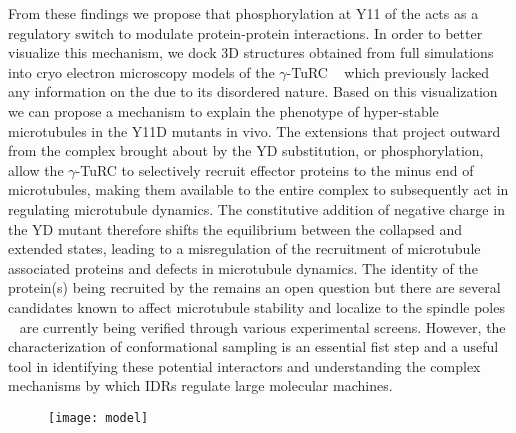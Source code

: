 \begin{figure}
\centering     %
{}
\label{fig:wells}
\end{figure}

From these findings we propose that phosphorylation at Y11 of the \gct acts as a regulatory switch to modulate protein-protein interactions. In order to better visualize this mechanism, we dock 3D structures obtained from full \tub simulations into cryo electron microscopy models of the $\gamma$-TuRC ~\cite{kollman2015ring}  which previously lacked any information on the \gct due to its disordered nature. Based on this visualization we can propose a mechanism to explain the phenotype of hyper-stable microtubules in the Y11D mutants in vivo. The extensions that project outward from the complex brought about by the YD substitution, or phosphorylation, allow the $\gamma$-TuRC to selectively recruit effector proteins to the minus end of microtubules, making them available to the entire complex to subsequently act in regulating microtubule dynamics. The constitutive addition of negative charge in the YD mutant therefore shifts the equilibrium between the collapsed and extended states, leading to a misregulation of the recruitment of microtubule associated proteins and defects in microtubule dynamics. The identity of the  protein(s) being recruited by the \gct remains an open question but there are several candidates known to affect microtubule stability and localize to the spindle poles ~\cite{cuschieri2006gamma} are currently being verified through various experimental screens. However, the characterization of \gct conformational sampling  is an essential fist step and a useful tool in identifying these potential interactors and understanding the complex mechanisms by which IDRs regulate large molecular machines.

\begin{figure}
\centering
\texttt{[image: model]}
\label{fig:turc}
\end{figure}
